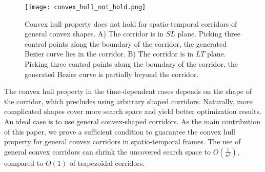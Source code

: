 
\begin{figure}[tbp]
\begin{center}
\texttt{[image: convex\_hull\_not\_hold.png]}
\end{center}
\vspace{-0.2 in}
\caption{Convex hull property does not hold for spatio-temporal corridors of general convex shapes. A) The corridor is in $SL$ plane. Picking three control points along the boundary of the corridor, the generated
Bezier curve lies in the corridor. B) The corridor is in $LT$ plane. Picking three control points along the boundary of the corridor, the generated
Bezier curve is partially beyond the corridor. }
\label{Fig:ConvexHullNotHold}
\vspace{-0.2 in}
\end{figure}

The convex hull property in the time-dependent cases depends on the shape of the corridor, which precludes using arbitrary shaped corridors. Naturally, more complicated shapes cover more search space and yield better optimization results. An ideal case is to use general convex-shaped corridors. As the main contribution of this paper, we prove a sufficient condition to guarantee the convex hull property for general convex corridors in spatio-temporal frames. The use of general convex corridors can shrink the uncovered search space to $O(\frac{1}{n^2})$, compared to $O(1)$ of trapezoidal corridors.

